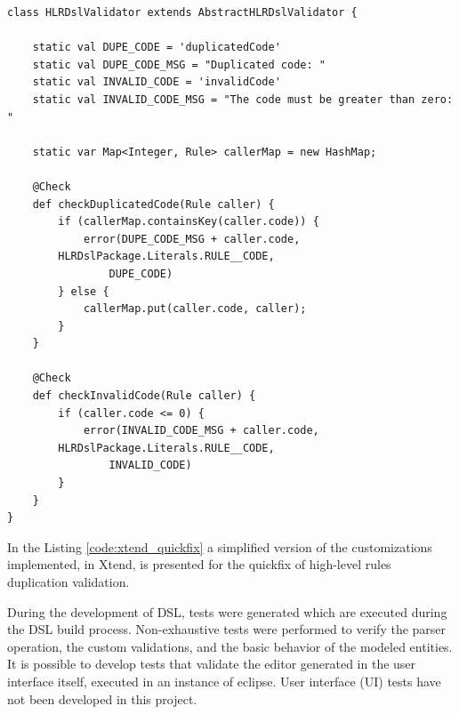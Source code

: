 \documentclass[AMA,STIX1COL]{WileyNJD-v2}
\begin{document}
\begin{small}
\begin{lstlisting}[frame=single, language=Xtend, caption={\it Validation Customization}, label={code:xtend_validation}]
class HLRDslValidator extends AbstractHLRDslValidator {

	static val DUPE_CODE = 'duplicatedCode'
	static val DUPE_CODE_MSG = "Duplicated code: "
	static val INVALID_CODE = 'invalidCode'
	static val INVALID_CODE_MSG = "The code must be greater than zero: "
	
	static var Map<Integer, Rule> callerMap = new HashMap;

	@Check
	def checkDuplicatedCode(Rule caller) {
		if (callerMap.containsKey(caller.code)) {
			error(DUPE_CODE_MSG + caller.code, 
        HLRDslPackage.Literals.RULE__CODE, 
				DUPE_CODE)
		} else {
			callerMap.put(caller.code, caller);
		}
	}

	@Check
	def checkInvalidCode(Rule caller) {
		if (caller.code <= 0) {
			error(INVALID_CODE_MSG + caller.code, 
        HLRDslPackage.Literals.RULE__CODE,
				INVALID_CODE)
		}
	}
}	
\end{lstlisting}
\end{small}


In the Listing \ref{code:xtend_quickfix} a simplified version of the customizations implemented, in Xtend, is presented for the quickfix of high-level rules duplication validation.





During the development of DSL, tests were generated which are executed during the DSL build process. Non-exhaustive tests were performed to verify the parser operation, the custom validations, and the basic behavior of the modeled entities. It is possible to develop tests that validate the editor generated in the user interface itself, executed in an instance of eclipse. User interface (UI) tests have not been developed in this project.
\end{document}

